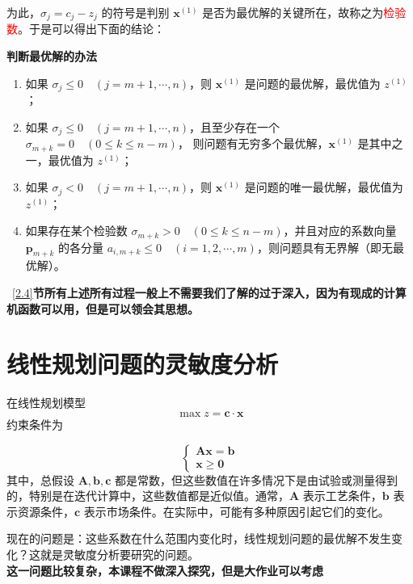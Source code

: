     为此，\( \sigma_j = c_j - z_j \) 的符号是判别 \( \mathbf{x}^{(1)} \) 是否为最优解的关键所在，故称之为\textcolor{red}{检验数}。于是可以得出下面的结论：
    \begin{notebox}{\textbf{判断最优解的办法}}
        \begin{enumerate}
            \item 如果 \( \sigma_j \leq 0 \quad (j = m+1, \cdots, n) \)，则 \( \mathbf{x}^{(1)} \) 是问题的最优解，最优值为 \( z^{(1)} \)；
            \item 如果 \( \sigma_j \leq 0 \quad (j = m+1, \cdots, n) \)，且至少存在一个 \( \sigma_{m+k} = 0 \quad (0 \leq k \leq n-m) \)，
            则问题有无穷多个最优解，\( \mathbf{x}^{(1)} \) 是其中之一，最优值为 \( z^{(1)} \)；
            \item 如果 \( \sigma_j < 0 \quad (j = m+1, \cdots, n) \)，则 \( \mathbf{x}^{(1)} \) 是问题的唯一最优解，最优值为 \( z^{(1)} \)；
            \item 如果存在某个检验数 \( \sigma_{m+k} > 0 \quad (0 \leq k \leq n-m) \)，并且对应的系数向量 \( \mathbf{p}_{m+k} \) 的各分量
            \( a_{i, m+k} \leq 0 \quad (i = 1, 2, \cdots, m) \)，则问题具有无界解（即无最优解）。
        \end{enumerate}
    \end{notebox}
    
    ~\ref{2.4}\textbf{节所有上述所有过程一般上不需要我们了解的过于深入，因为有现成的计算机函数可以用，但是可以领会其思想。}


    \section{线性规划问题的灵敏度分析}
    在线性规划模型
    \[
    \max z = \mathbf{c} \cdot \mathbf{x}
    \]
    约束条件为

    \[
    \left\{
    \begin{array}{l}
    \mathbf{A} \mathbf{x} = \mathbf{b} \\
    \mathbf{x} \geq \mathbf{0}
    \end{array}
    \right.
    \]
    其中，总假设 \( \mathbf{A}, \mathbf{b}, \mathbf{c} \) 都是常数，但这些数值在许多情况下是由试验或测量得到的，特别是在迭代计算中，这些数值都是近似值。通常，\( \mathbf{A} \) 表示工艺条件，\( \mathbf{b} \) 表示资源条件，\( \mathbf{c} \) 表示市场条件。在实际中，可能有多种原因引起它们的变化。

    现在的问题是：这些系数在什么范围内变化时，线性规划问题的最优解不发生变化？这就是灵敏度分析要研究的问题。\\
    \textbf{这一问题比较复杂，本课程不做深入探究，但是大作业可以考虑}



